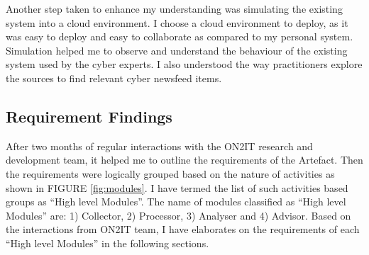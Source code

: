 Another step taken to enhance my understanding was simulating the existing system into a cloud environment. I choose a cloud environment to deploy, as it was easy to deploy and easy to collaborate as compared to my personal system. 
Simulation helped me to observe and understand the behaviour of the existing system used by the cyber experts. 
I also understood the way practitioners explore the sources to find relevant cyber newsfeed items. 


\subsection{Requirement Findings}
After two months of regular interactions with the ON2IT research and development team, it helped me to outline the requirements of the Artefact. 
Then the requirements were logically grouped based on the nature of activities as shown in FIGURE \ref{fig:modules}. I have termed
the list of such activities based groups as \enquote{High level Modules}. The name of modules classified as \enquote{High level Modules} are: 1) Collector, 2) Processor, 3) Analyser and 4) Advisor.  Based on the interactions from ON2IT team, I have elaborates on the requirements of each \enquote{High level Modules} in the following sections. 

